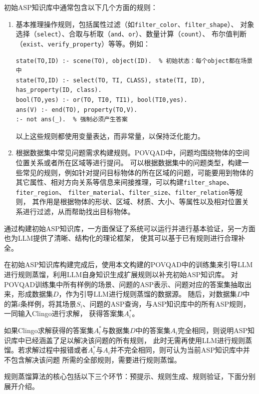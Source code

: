 初始ASP知识库中通常包含以下几个方面的规则：
\begin{enumerate}[nosep]
\item 基本推理操作规则，包括属性过滤（如\texttt{filter\_color}、\texttt{filter\_shape}）、
对象选择（\texttt{select}）、合取与析取（\texttt{and}、\texttt{or}）、数量计算（\texttt{count}）、
布尔值判断（\texttt{exist}、\texttt{verify\_property}）等等。例如：
\begin{lstlisting}
state(TO,ID) :- scene(TO), object(ID).  % 初始状态：每个object都在场景中
state(TO,ID) :- select(TO, TI, CLASS), state(TI, ID), has_property(ID, class).
bool(TO,yes) :- or(TO, TI0, TI1), bool(TI0,yes).
ans(V) :- end(TO), property(TO,V).
:- not ans(_).  % 强制必须产生答案
\end{lstlisting}
以上这些规则都使用变量表达，而非常量，以保持泛化能力。
\item 根据数据集中常见问题需求构建规则。POVQAD中，问题均围绕物体的空间位置关系或者所在区域等进行提问。
可以根据数据集中的问题类型，构建一些常见的规则，例如针对提问目标物体的所在区域的问题，可能要用到物体的
其它属性、相对方向关系等信息来间接推理，可以构建\texttt{filter\_shape}、\texttt{fiter\_region}、
\texttt{filter\_material}、\texttt{filter\_size}、\texttt{filter\_relation}等规则，
其作用是根据物体的形状、区域、材质、大小、等属性以及相对位置关系进行过滤，从而帮助找出目标物体。
\end{enumerate}

通过构建初始ASP知识库，一方面保证了系统可以运行并进行基本验证，另一方面也为LLM提供了清晰、结构化的理论框架，
使其可以基于已有规则进行合理补全。

在初始ASP知识库构建完成后，使用本文构建的POVQAD中的训练集来引导LLM进行规则蒸馏，利用LLM自身知识生成扩展规则以补充初始ASP知识库。
对POVQAD训练集中所有样例的场景、问题的ASP表示、问题对应的答案集抽取出来，形成数据集$D$，作为引导LLM进行规则蒸馏的数据源。
随后，对数据集$D$中的第$i$条样例，将其场景$S_i$、问题的ASP查询，与ASP知识库中的所有ASP规则，一同输入Clingo进行求解，
获得答案集$A^*_i$。

如果Clingo求解获得的答案集$A^*_i$与数据集$D$中的答案集$A_i$完全相同，则说明ASP知识库中已经涵盖了足以解决该问题的所有规则，
此时无需再使用LLM进行规则蒸馏。若求解过程中报错或者$A^*_i$与$A_i$并不完全相同，则可认为当前ASP知识库中并不包含解决该问题
所需的全部规则，需要进行规则蒸馏。

规则蒸馏算法的核心包括以下三个环节：预提示、规则生成、规则验证，下面分别展开介绍。

